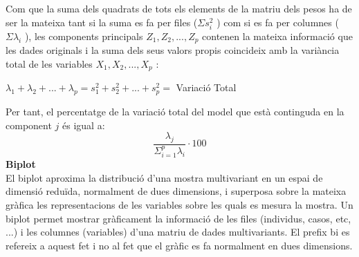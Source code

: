 \documentclass[english]{article}
\begin{document}
Com que la suma dels quadrats de tots els elements de la matriu dels pesos ha de ser la
mateixa tant si la suma es fa per files ($\Sigma s_i^2$ ) com si es fa per columnes ($\Sigma\lambda_i$ ), les components principals $Z_1,Z_2,...,Z_p$ contenen la mateixa informació que les dades
originals i la suma dels seus valors propis coincideix amb la variància total de les
variables $X_1, X_2,...,X_p$ :
\begin{center}
$\lambda_{1} + \lambda_{2} + ... + \lambda_{p} = s_1^2 + s_2^2 + ... + s_p^2 =$ Variació Total
\end{center}
Per tant, el percentatge de la variació total del model que està continguda en la
component $j$ és igual a:
\begin{equation*}
\frac{\lambda_j}{\Sigma_{i=1}^p \lambda_i}\cdot 100
\end{equation*}
\noindent\textbf{Biplot}\\

El biplot aproxima la distribució d'una mostra multivariant en un espai de dimensió reduïda, normalment de dues dimensions, i superposa sobre la mateixa gràfica les representacions de les variables sobre les quals es mesura la mostra. Un biplot permet mostrar gràficament la informació de les files (individus, casos, etc, ...) i les columnes (variables) d'una matriu de dades multivariants. El prefix bi es refereix a aquest fet i no al fet que el gràfic es fa normalment en dues dimensions.
\\
\end{document}
